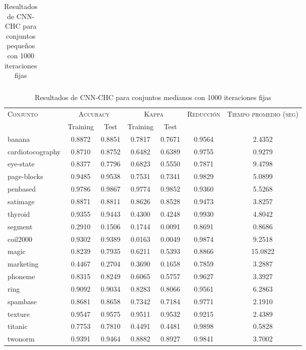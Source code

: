 \begin{table}[]
\begin{tabular}{l c c c c c c}
\hline
\end{tabular}
\caption{Resultados de CNN-CHC para conjuntos pequeños con 1000 iteraciones fijas}
\label{res-peq-CNN-CHC}
\end{table}


\begin{table}[]
\centering
\begin{tabular}{l c c c c c c}
\hline
\multirow{2}{*}{\textsc{Conjunto}}
	& \multicolumn{2}{c}{\textsc{Accuracy}}
	& \multicolumn{2}{c}{\textsc{Kappa}}
	& \textsc{Reducción}
	& \textsc{Tiempo promedio (seg)} \\
	& Training & Test
	& Training & Test \\ 
\hline
\hline

banana & 0.8872 & 0.8851 & 0.7817 & 0.7671 & 0.9564 & 2.4352 \\
cardiotocography & 0.8710 & 0.8752 & 0.6482 & 0.6389 & 0.9755 & 0.9279 \\
eye-state & 0.8377 & 0.7796 & 0.6823 & 0.5550 & 0.7871 & 9.4798 \\
page-blocks & 0.9485 & 0.9538 & 0.7531 & 0.7341 & 0.9829 & 5.0899 \\
penbased & 0.9786 & 0.9867 & 0.9774 & 0.9852 & 0.9360 & 5.5268 \\
satimage & 0.8871 & 0.8811 & 0.8626 & 0.8528 & 0.9473 & 3.8257 \\
thyroid & 0.9355 & 0.9443 & 0.4300 & 0.4248 & 0.9930 & 4.8042 \\
segment & 0.2910 & 0.1506 & 0.1744 & 0.0091 & 0.8691 & 0.8686 \\
coil2000 & 0.9302 & 0.9389 & 0.0163 & 0.0049 & 0.9874 & 9.2518 \\
magic & 0.8239 & 0.7935 & 0.6211 & 0.5393 & 0.8866 & 15.0822 \\
marketing & 0.4467 & 0.2704 & 0.3690 & 0.1658 & 0.7859 & 3.2887 \\
phoneme & 0.8315 & 0.8249 & 0.6065 & 0.5757 & 0.9627 & 3.3927 \\
ring & 0.9092 & 0.9034 & 0.8283 & 0.8066 & 0.9561 & 6.2863 \\
spambase & 0.8681 & 0.8658 & 0.7342 & 0.7184 & 0.9771 & 2.1910 \\
texture & 0.9547 & 0.9575 & 0.9511 & 0.9532 & 0.9215 & 2.4389 \\
titanic & 0.7753 & 0.7810 & 0.4491 & 0.4481 & 0.9898 & 0.5828 \\
twonorm & 0.9391 & 0.9464 & 0.8882 & 0.8927 & 0.9841 & 3.7002 \\

\hline
\end{tabular}
\caption{Resultados de CNN-CHC para conjuntos medianos con 1000 iteraciones fijas}
\label{res-med-CNN-CHC}
\end{table}


